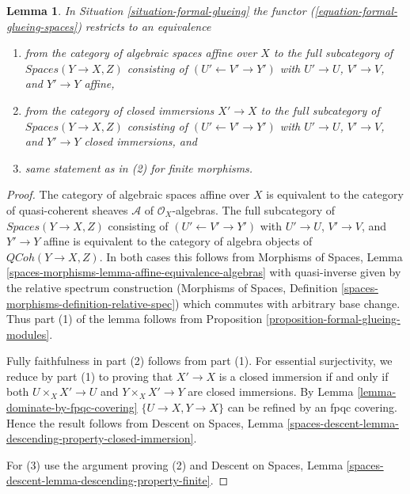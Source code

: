 \documentclass[10pt,a4paper]{amsart}
\theoremstyle{plain}
\newtheorem{lemma}[subsection]{Lemma}
\theoremstyle{definition}
\theoremstyle{remark}
\numberwithin{equation}{subsection}
\def\QCoh{\mathit{QCoh}}
\begin{document}
\begin{lemma}
\label{lemma-equivalence-on-affine}
In Situation \ref{situation-formal-glueing} the functor
(\ref{equation-formal-glueing-spaces}) restricts to an
equivalence
\begin{enumerate}
\item from the category of algebraic spaces affine over $X$
to the full subcategory of $\textit{Spaces}(Y \to X, Z)$ consisting
of $(U' \leftarrow V' \rightarrow Y')$ with $U' \to U$, $V' \to V$,
and $Y' \to Y$ affine,
\item from the category of closed immersions $X' \to X$
to the full subcategory of $\textit{Spaces}(Y \to X, Z)$ consisting
of $(U' \leftarrow V' \rightarrow Y')$ with $U' \to U$, $V' \to V$,
and $Y' \to Y$ closed immersions, and
\item same statement as in (2) for finite morphisms.
\end{enumerate}
\end{lemma}

\begin{proof}
The category of algebraic spaces affine over $X$ is equivalent to the
category of quasi-coherent sheaves $\mathcal{A}$ of $\mathcal{O}_X$-algebras.
The full subcategory of $\textit{Spaces}(Y \to X, Z)$ consisting of
$(U' \leftarrow V' \rightarrow Y')$ with $U' \to U$, $V' \to V$,
and $Y' \to Y$ affine is equivalent to the category of
algebra objects of $\QCoh(Y \to X, Z)$. In both cases this follows
from Morphisms of Spaces, Lemma
\ref{spaces-morphisms-lemma-affine-equivalence-algebras}
with quasi-inverse given by the relative spectrum construction
(Morphisms of Spaces, Definition
\ref{spaces-morphisms-definition-relative-spec})
which commutes with arbitrary base change. Thus part (1) of the
lemma follows from Proposition \ref{proposition-formal-glueing-modules}.

\medskip\noindent
Fully faithfulness in part (2) follows from part (1). For essential
surjectivity, we reduce by part (1) to proving that $X' \to X$
is a closed immersion if and only if both $U \times_X X' \to U$ and
$Y \times_X X' \to Y$ are closed immersions. By
Lemma \ref{lemma-dominate-by-fpqc-covering}
$\{U \to X, Y \to X\}$ can be refined by an fpqc covering.
Hence the result follows from
Descent on Spaces, Lemma
\ref{spaces-descent-lemma-descending-property-closed-immersion}.

\medskip\noindent
For (3) use the argument proving (2) and
Descent on Spaces, Lemma
\ref{spaces-descent-lemma-descending-property-finite}.
\end{proof}
\end{document}
